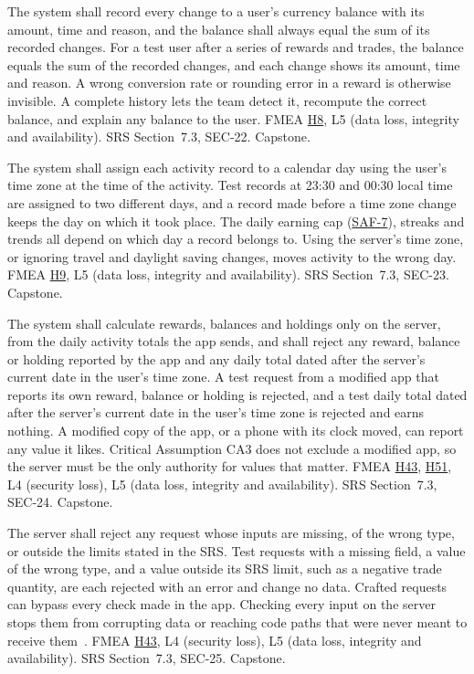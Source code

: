 \documentclass{article}
\newcommand{\reqref}[1]{\hyperref[req:#1]{#1}}
\newcommand{\hazref}[1]{\hyperref[#1]{#1}}
\begin{document}
\begin{description}
{The system shall record every change to a user's currency balance with its
amount, time and reason, and the balance shall always equal the sum of its
recorded changes.}
{For a test user after a series of rewards and trades, the balance equals the
sum of the recorded changes, and each change shows its amount, time and
reason.}
{A wrong conversion rate or rounding error in a reward is otherwise invisible.
A complete history lets the team detect it, recompute the correct balance, and
explain any balance to the user.}
{FMEA \hazref{H8}, L5 (data loss, integrity and availability).}
{SRS Section~7.3, SEC-22.}
{Capstone.}

{The system shall assign each activity record to a calendar day using the
user's time zone at the time of the activity.}
{Test records at 23:30 and 00:30 local time are assigned to two different days,
and a record made before a time zone change keeps the day on which it took
place.}
{The daily earning cap (\reqref{SAF-7}), streaks and trends all depend on which
day a record belongs to. Using the server's time zone, or ignoring travel and
daylight saving changes, moves activity to the wrong day.}
{FMEA \hazref{H9}, L5 (data loss, integrity and availability).}
{SRS Section~7.3, SEC-23.}
{Capstone.}

{The system shall calculate rewards, balances and holdings only on the server,
from the daily activity totals the app sends, and shall reject any reward,
balance or holding reported by the app and any daily total dated after
the server's current date in the user's time zone.}
{A test request from a modified app that reports its own reward, balance or
holding is rejected, and a test daily total dated after
the server's current date in the user's time zone is rejected and earns nothing.}
{A modified copy of the app, or a phone with its clock moved, can report any
value it likes. Critical Assumption CA3 does not exclude a modified app, so the
server must be the only authority for values that matter.}
{FMEA \hazref{H43}, \hazref{H51}, L4 (security loss), L5 (data loss, integrity and availability).}
{SRS Section~7.3, SEC-24.}
{Capstone.}

{The server shall reject any request whose inputs are missing, of the wrong
type, or outside the limits stated in the SRS.}
{Test requests with a missing field, a value of the wrong type, and a value
outside its SRS limit, such as a negative trade quantity, are each rejected
with an error and change no data.}
{Crafted requests can bypass every check made in the app. Checking every input
on the server stops them from corrupting data or reaching code paths that were
never meant to receive them~\cite{OWASPMobileTop10}.}
{FMEA \hazref{H43}, L4 (security loss), L5 (data loss, integrity and availability).}
{SRS Section~7.3, SEC-25.}
{Capstone.}


\end{description}
\end{document}
